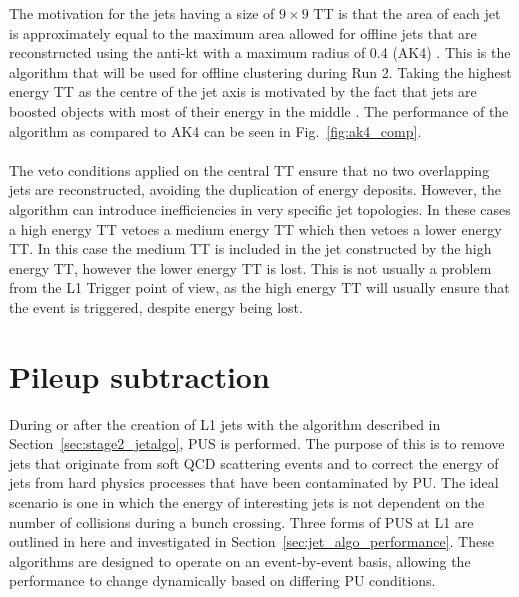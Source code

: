 The motivation for the jets having a size of $9\times9$ TT is that the
area of each jet is approximately equal to the maximum area allowed
for offline jets that are reconstructed using the anti-kt with a
maximum radius of 0.4 (AK4) \cite{antiktJetAlgorithm}. This is the
algorithm that will be used for offline clustering during Run 2.
Taking the highest energy TT as the centre of the jet axis is
motivated by the fact that jets are boosted objects with most of their
energy in the middle \cite{JetProfile_pileup}. The performance of the
algorithm as compared to AK4 can be seen in Fig.~\ref{fig:ak4_comp}.
\\\\
The veto conditions applied on the central TT ensure that no two overlapping jets are reconstructed, avoiding the duplication of energy deposits. However, the algorithm can introduce inefficiencies in very specific jet topologies. In these cases a high energy TT vetoes a medium energy TT which then vetoes a lower energy TT. In this case the medium TT is included in the jet constructed by the high energy TT, however the lower energy TT is lost. This is not usually a problem from the L1 Trigger point of view, as the high energy TT will usually ensure that the event is triggered, despite energy being lost.


\section{Pileup subtraction}
\label{sec:pus}

During or after the creation of L1 jets with the algorithm described in Section~\ref{sec:stage2_jetalgo}, PUS is performed. The purpose of this is to remove jets that originate from soft QCD scattering events and to correct the energy of jets from hard physics processes that have been contaminated by PU. The ideal scenario is one in which the energy of interesting jets is not dependent on the number of collisions during a bunch crossing. Three forms of PUS at L1 are outlined in here and investigated in Section~\ref{sec:jet_algo_performance}. These algorithms are designed to operate on an event-by-event basis, allowing the performance to change dynamically based on differing PU conditions. 

